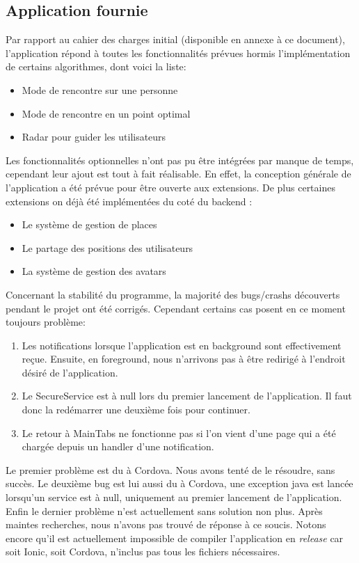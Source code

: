 \documentclass[french]{article}
\begin{document}
		\subsection{Application fournie}			
		Par rapport au cahier des charges initial (disponible en annexe à ce document), l'application répond à toutes les fonctionnalités prévues hormis l'implémentation de certains algorithmes, dont voici la liste:
		\begin{itemize}
			\item Mode de rencontre sur une personne
			\item Mode de rencontre en un point optimal
			\item Radar pour guider les utilisateurs
		\end{itemize}
		Les fonctionnalités optionnelles n'ont pas pu être intégrées par manque de temps, cependant leur ajout est tout à fait réalisable. En effet, la conception générale de l'application a été prévue pour être ouverte aux extensions. De plus certaines extensions on déjà été implémentées du coté du backend : 
		\begin{itemize}
			\item Le système de gestion de places
			\item Le partage des positions des utilisateurs
			\item La système de gestion des avatars
		\end{itemize}
		
		Concernant la stabilité du programme, la majorité des bugs/crashs découverts pendant le projet ont été corrigés. Cependant certains cas posent en ce moment toujours problème:
		\begin{enumerate}
			\item Les notifications lorsque l'application est en background sont effectivement reçue. Ensuite, en foreground, nous n'arrivons pas à être redirigé à l'endroit désiré de l'application.
			\item Le SecureService est à null lors du premier lancement de l'application. Il faut donc la redémarrer une deuxième fois pour continuer.
			\item Le retour à MainTabs ne fonctionne pas si l'on vient d'une page qui a été chargée depuis un handler d'une notification.
		\end{enumerate}
		Le premier problème est du à Cordova. Nous avons tenté de le résoudre, sans succès.
		Le deuxième bug est lui aussi du à Cordova, une exception java est lancée lorsqu'un service est à null, uniquement au premier lancement de l'application.
		Enfin le dernier problème n'est actuellement sans solution non plus. Après maintes recherches, nous n'avons pas trouvé de réponse à ce soucis. Notons encore qu'il est actuellement impossible de compiler l'application en \textit{release} car soit Ionic, soit Cordova, n'inclus pas tous les fichiers nécessaires.
		
\end{document}
